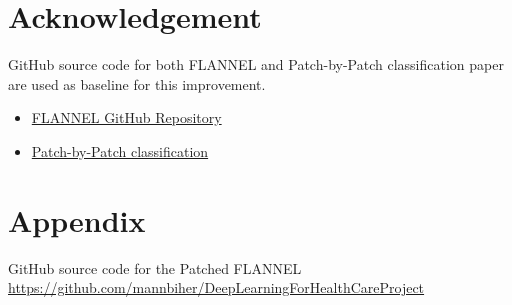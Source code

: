 \documentclass{sigkddExp}
\begin{document}
\section{Acknowledgement}
GitHub source code for both FLANNEL and Patch-by-Patch classification
\cite{pmid32396075} paper are used as baseline for this improvement.
\begin{itemize}
    \item \href{https://github.com/qxiaobu/FLANNEL}{FLANNEL GitHub Repository}
    \item \href{https://github.com/jongcye/Deep-Learning-COVID-19-on-CXR-using-Limited-Training-Data-Sets}
          {Patch-by-Patch classification}
\end{itemize}


\section{Appendix}
GitHub source code for the Patched FLANNEL
\url{https://github.com/mannbiher/DeepLearningForHealthCareProject}

\clearpage
%

\end{document}
